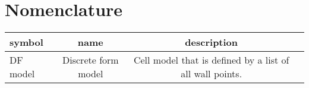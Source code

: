 \section*{Nomenclature}

\begin{table}[h]
    \label{tab:example}
    \centering
    \begin{tabular}{lccp{5cm}}
    \toprule
    \textbf{symbol} & \textbf{name} & \multicolumn{1}{c}{\textbf{description}}\\ 
    \midrule
    DF model & Discrete form model & Cell model that is defined by a list of all wall points. \\
    \bottomrule
    \end{tabular}
 \end{table}